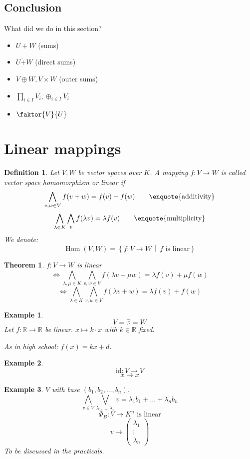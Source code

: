 \documentclass[a4paper,landscape,twocolumn]{article}
\newcommand\setdef[2]{\left\{#1\,\middle|\,#2\right\}}
\newtheorem{theorem}{Theorem}
\newtheorem{defi}{Definition}
\newtheorem{ex}{Example}
\DeclareMathOperator\Hom{Hom} %
\begin{document}
\subsection{Conclusion}

What did we do in this section?
\begin{itemize}
  \item $U+W$ (sums)
  \item $U\dot{+}W$ (direct sums)
  \item $V\oplus W, V \times W$ (outer sums)
  \item $\prod_{i \in I} V_i, \oplus_{i \in I} V_i$
  \item $\faktor{V}{U}$
\end{itemize}

\section{Linear mappings}
\begin{defi}
  Let $V, W$ be vector spaces over $K$.
  A mapping $f: V \rightarrow W$ is called \emph{vector space homomorphism}
  or \emph{linear} if
  \[ \bigwedge_{v,w\in V} f(v+w) = f(v) + f(w) \qquad \text{\enquote{additivity}} \]
  \[ \bigwedge_{\lambda \in K} \bigwedge_{v} f(\lambda v) = \lambda f(v)  \qquad \text{\enquote{multiplicity}} \]
  We denote:
  \[ \Hom(V, W) = \setdef{f: V \rightarrow W}{f \text{ is linear}} \]
\end{defi}

\begin{theorem}
  \label{satz-5-2}
  $f: V \rightarrow W$ is linear
  \[ \Leftrightarrow \bigwedge_{\lambda,\mu \in K} \bigwedge_{v,w \in V} f(\lambda v + \mu w) = \lambda f(v) + \mu f(w) \]
  \[ \Leftrightarrow \bigwedge_{\lambda \in K} \bigwedge_{v,w \in V} f(\lambda v + w) = \lambda f(v) + f(w) \]
\end{theorem}

\begin{ex}
  \label{bsp-5-3}
  \[ V = \mathbb R = W \]
  Let $f: \mathbb R \rightarrow \mathbb R$ be linear.
  $x \mapsto k \cdot x$ with $k \in \mathbb R$ fixed.

  As in high school: $f(x) = kx + d$.
\end{ex}
\begin{ex}
  \[ \text{id}: V \rightarrow V \]
  \[ x \mapsto x \]
\end{ex}
\begin{ex}
  $V$ with base $(b_1, b_2, \dots, b_n)$.
  \[ \bigwedge_{v \in V} \bigvee_{\lambda_1, \dots, \lambda_n} v = \lambda_1 b_1  + \dots + \lambda_n b_n \]
  \[ \Phi_B: V \rightarrow K^n \text{ is linear} \]
  \[ v \mapsto \begin{pmatrix} \lambda_1 \\ \vdots \\ \lambda_n \end{pmatrix} \]
  To be discussed in the practicals.
\end{ex}
\end{document}
